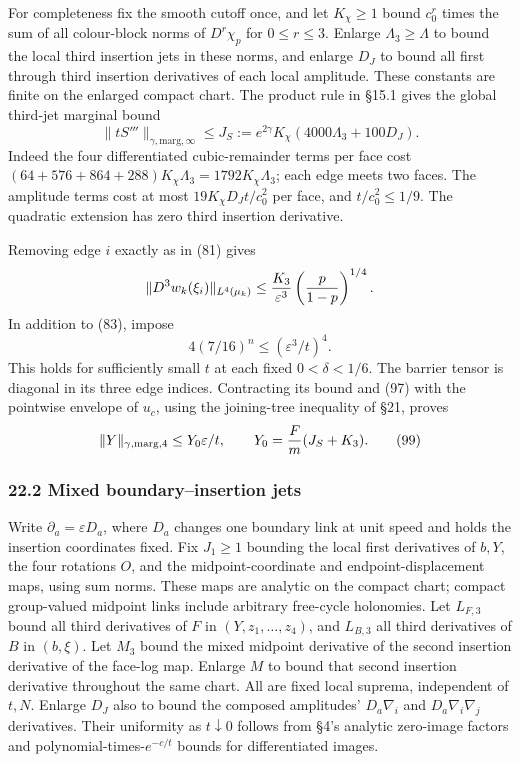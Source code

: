 \documentclass[11pt,a4paper]{article}
\begin{document}
For completeness fix the smooth cutoff once, and let \(K_\chi\ge1\)
bound \(c_0^r\) times the sum of all colour-block norms of \(D^r\chi_p\)
for \(0\le r\le3\). Enlarge \(\Lambda_3\ge\Lambda\) to bound the local
third insertion jets in these norms, and enlarge \(D_J\) to bound all
first through third insertion derivatives of each local amplitude. These
constants are finite on the enlarged compact chart. The product rule in
§15.1 gives the global third-jet marginal bound
\[\|tS'''\|_{\gamma,\mathrm{marg},\infty}\le
J_S:=e^{2\gamma}K_\chi(4000\Lambda_3+100D_J).\tag{97}\] Indeed the four
differentiated cubic-remainder terms per face cost
\((64+576+864+288)K_\chi\Lambda_3=1792K_\chi\Lambda_3\); each edge meets
two faces. The amplitude terms cost at most \(19K_\chi D_Jt/c_0^2\) per
face, and \(t/c_0^2\le1/9\). The quadratic extension has zero third
insertion derivative.

Removing edge \(i\) exactly as in (81) gives
\[\|D^3w_k(\xi_i)\|_{L^4(\mu_k)}
\le {K_3\over\varepsilon^3}\left({p\over1-p}\right)^{1/4}.\] In addition
to (83), impose \[4(7/16)^n\le(\varepsilon^3/t)^4.\tag{98}\] This holds
for sufficiently small \(t\) at each fixed \(0<\delta<1/6\). The barrier
tensor is diagonal in its three edge indices. Contracting its bound and
(97) with the pointwise envelope of \(u_c\), using the joining-tree
inequality of §21, proves
\[\|Y\|_{\gamma,\mathrm{marg},4}\le Y_0\varepsilon/t,
\qquad Y_0={F\over m}(J_S+K_3).\tag{99}\]

\hypertarget{mixed-boundaryinsertion-jets}{%
\subsubsection{22.2 Mixed boundary--insertion
jets}\label{mixed-boundaryinsertion-jets}}

Write \(\partial_a=\varepsilon D_a\), where \(D_a\) changes one boundary
link at unit speed and holds the insertion coordinates fixed. Fix
\(J_1\ge1\) bounding the local first derivatives of \(b,Y\), the four
rotations \(O\), and the midpoint-coordinate and endpoint-displacement
maps, using sum norms. These maps are analytic on the compact chart;
compact group-valued midpoint links include arbitrary free-cycle
holonomies. Let \(L_{F,3}\) bound all third derivatives of \(F\) in
\((Y,z_1,\ldots,z_4)\), and \(L_{B,3}\) all third derivatives of \(B\)
in \((b,\xi)\). Let \(M_3\) bound the mixed midpoint derivative of the
second insertion derivative of the face-log map. Enlarge \(M\) to bound
that second insertion derivative throughout the same chart. All are
fixed local suprema, independent of \(t,N\). Enlarge \(D_J\) also to
bound the composed amplitudes' \(D_a\nabla_i\) and
\(D_a\nabla_i\nabla_j\) derivatives. Their uniformity as
\(t\downarrow0\) follows from §4's analytic zero-image factors and
polynomial-times-\(e^{-c/t}\) bounds for differentiated images.
\end{document}
